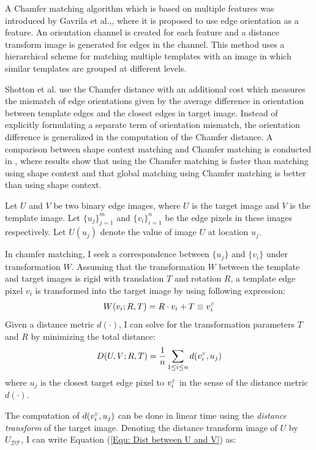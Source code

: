 \documentclass{iitthesis}
\begin{document}
A Chamfer matching algorithm which is based on multiple features was introduced by Gavrila et al.\cite{DG:98},\cite{DG:99}, where it is proposed to use edge orientation as a feature. An orientation channel is created for each feature and a distance transform image is generated for edges in the channel. This method uses a hierarchical scheme for matching multiple templates with an image in which similar templates are grouped at different levels.

Shotton et al.\cite{JS:08} use the Chamfer distance with an additional cost which measures the mismatch of edge orientations given by the average difference in orientation between template edges and the closest edges in target image. Instead of explicitly formulating a separate term of orientation mismatch, the orientation difference is generalized in the computation of the Chamfer distance\cite{ML:10}. A comparison between shape context matching and Chamfer matching is conducted in \cite{AT:03}, where results show that using the Chamfer matching is faster than matching using shape context and that global matching using Chamfer matching is better than using shape context.

 Let $U$ and $V$ be two binary edge images, where $U$ is the target image and $V$ is the template image. Let $\{u_j\}_{j=1}^m$ and $\{v_i\}_{i=1}^n$ be the edge pixels in these images respectively. Let $U(u_j)$ denote the value of image $U$ at location $u_j$.

In chamfer matching, I seek a correspondence between $\{u_j\}$ and $\{v_i\}$ under transformation $W$. Assuming that the transformation $W$ between the template and target images is rigid with translation $T$ and rotation $R$, a template edge pixel $v_i$ is transformed into the target image by using following expression:
\begin{equation}
W(v_i;R, T)=R \cdot v_i + T \equiv v_i^{\scalebox{.5}{\textit{U}}}
\end{equation}
Given a distance metric $d(\cdot)$, I can solve for the transformation parameters $T$ and $R$ by minimizing the total distance:
\begin{equation}
D(U, V;R, T)=\frac{1}{n}\sum_{1\leq i\leq n}d(v_i^{\scalebox{.5}{\textit{U}}}, u_j)
\label{Equ: Dist between U and V}
\end{equation}
where $u_j$ is the closest target edge pixel to $v_i^{\scalebox{.5}{\textit{U}}}$ in the sense of the distance metric $d(\cdot)$.

The computation of $d(v_i^{\scalebox{.5}{\textit{U}}}, u_j)$ can be done in linear time using the \textit{distance transform} of the target image\cite{AR:66}. Denoting the distance transform image of $U$ by $U_{\mathcal{DT}}$, I can write Equation (\ref{Equ: Dist between U and V}) as:
\end{document}
